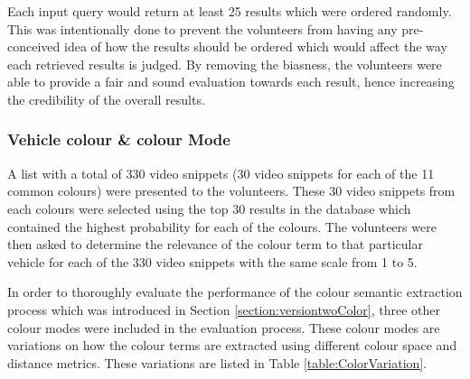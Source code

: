 Each input query would return at least 25 results which were ordered randomly. This was intentionally done to prevent the volunteers from having any pre-conceived idea of how the results should be ordered which would affect the way each retrieved results is judged. By removing the biasness, the volunteers were able to provide a fair and sound evaluation towards each result, hence increasing the credibility of the overall results.


\subsubsection{Vehicle colour \& colour Mode}
\label{subsec:vehColor}
A list with a total of 330 video snippets (30 video snippets for each of the 11 common colours) were presented to the volunteers. These 30 video snippets from each colours were selected using the top 30 results in the database which contained the highest probability for each of the colours. The volunteers were then asked to determine the relevance of the colour term to that particular vehicle for each of the 330 video snippets with the same scale from 1 to 5.

In order to thoroughly evaluate the performance of the colour semantic extraction process which was introduced in Section \ref{section:versiontwoColor}, three other colour modes were included in the evaluation process. These colour modes are variations on how the colour terms are extracted using different colour space and distance metrics. These variations are listed in Table \ref{table:ColorVariation}.

